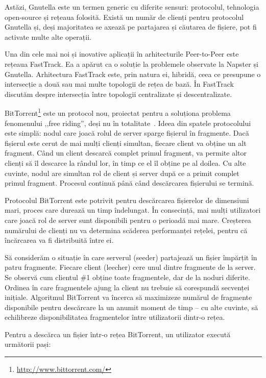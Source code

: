 Astăzi, Gnutella este un termen generic cu diferite sensuri: protocolul,
tehnologia open-source și rețeaua folosită. Există un număr de clienți pentru
protocolul Gnutella și, deși majoritatea se axează pe partajarea și
căutarea de fișiere, pot fi activate multe alte operații.

Una din cele mai noi și inovative aplicații în arhitecturile Peer-to-Peer este
rețeaua FastTrack. Ea a apărut ca o soluție la problemele observate la Napster
și Gnutella. Arhitectura FastTrack este, prin natura ei, hibridă, ceea ce
presupune o intersecție a două sau mai multe topologii de rețea de bază. În
FastTrack discutăm despre intersecția între topologii centralizate și
descentralizate.

BitTorrent\footnote{\url{http://www.bittorrent.com/}} este un protocol nou,
proiectat pentru a soluționa problema fenomenului ,,free riding'', deși nu
în totalitate~\cite{free-riding}. Ideea din spatele protocolului este simplă:
nodul care joacă rolul de server sparge fișierul în fragmente. Dacă fișierul
este cerut de mai mulți clienți simultan, fiecare client va obține un
alt fragment. Când un client descarcă complet primul fragment, va permite
altor clienți să îl descarce la rândul lor, în timp ce el îl obține pe al
doilea. Cu alte cuvinte, nodul are simultan rol de client și server după ce
a primit complet primul fragment. Procesul continuă până când descărcarea
fișierului se termină.

Protocolul BitTorrent este potrivit pentru descărcarea fișierelor de dimensiuni
mari, proces care durează un timp îndelungat. În consecință, mai mulți
utilizatori care joacă rol de server sunt disponibili pentru o perioadă mai
mare. Creșterea numărului de clienți nu va determina scăderea performanței
rețelei, pentru că încărcarea va fi distribuită între ei.

Să considerăm o situație în care serverul (seeder) partajează un fișier
împărțit în patru fragmente. Fiecare client (leecher) cere unul dintre
fragmente de la server. Se observă cum clientul \#1 obține toate fragmentele,
dar de la noduri diferite. Ordinea în care fragmentele ajung la client nu
trebuie să corespundă secvenței inițiale. Algoritmul BitTorrent va încerca
să maximizeze numărul de fragmente disponibile pentru descărcare la un anumit
moment de timp -- cu alte cuvinte, să echilibreze disponibilitatea fragmentelor
între utilizatorii dintr-o rețea.

Pentru a descărca un fișier într-o rețea BitTorrent, un utilizator execută
următorii pași:

